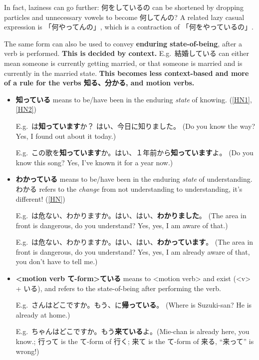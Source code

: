 \documentclass[../nihongo-gakushuu-kyouzai.tex]{subfiles}
\begin{document}
In fact, laziness can go further: 何をしているの can be shortened by dropping particles and unnecessary vowels to become 何してんの? A related lazy casual expression is 「何やってんの」, which is a contraction of 「何をやっているの」.

The same form can also be used to convey \textbf{enduring state-of-being}, after a verb is performed. \textbf{This is decided by context.} E.g.\ 結婚している can either mean someone is currently getting married, or that someone is married and is currently in the married state. \textbf{This becomes less context-based and more of a rule for the verbs 知る、分かる, and motion verbs.}

\begin{itemize}
    \item \textbf{知っている} means to be/have been in the enduring \emph{state} of knowing.  (\href{https://ja.hinative.com/questions/258648}{[HN1]}, \href{https://ja.hinative.com/questions/10745394}{[HN2]})

    E.g.\ は\textbf{知っています}か？ はい、今日に知りました。 (Do you know the way? Yes, I found out about it today.)

    E.g.\ この歌を\textbf{知っています}か。はい、１年前から\textbf{知っています}よ。 (Do you know this song? Yes, I've known it for a year now.)

    \item \textbf{わかっている} means to be/have been in the enduring \emph{state} of understanding. わかる refers to the \emph{change} from not understanding to understanding, it's different! (\href{https://ja.hinative.com/questions/355185}{[HN]})

    E.g.\ は危ない、わかりますか。はい、はい、\textbf{わかりました}。 (The area in front is dangerous, do you understand? Yes, yes, I am aware of that.)

    E.g.\ は危ない、わかりますか。はい、はい、\textbf{わかっています}。 (The area in front is dangerous, do you understand? Yes, yes, I am already aware of that, you don't have to tell me.)

    \item \textbf{<motion verb て-form>ている} means to <motion verb> and exist (<v> + いる), and refers to the state-of-being after performing the verb.

    E.g.\ さんはどこですか。もう、に\textbf{帰っている}。 (Where is Suzuki-san? He is already at home.)

    E.g.\ ちゃんはどこですか。もう\textbf{来ている}よ。(Mie-chan is already here, you know.; 行って is the て-form of 行く; 来て is the て-form of 来る, ``来って'' is wrong!)
\end{itemize}
\end{document}
